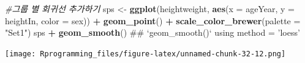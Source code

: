 \documentclass[10pt,]{krantz}
\makeatletter
\newenvironment{Shaded}{\begin{snugshade}}{\end{snugshade}}
\newcommand{\KeywordTok}[1]{\textcolor[rgb]{0.13,0.29,0.53}{\textbf{#1}}}
\newcommand{\DataTypeTok}[1]{\textcolor[rgb]{0.13,0.29,0.53}{#1}}
\newcommand{\StringTok}[1]{\textcolor[rgb]{0.31,0.60,0.02}{#1}}
\newcommand{\CommentTok}[1]{\textcolor[rgb]{0.56,0.35,0.01}{\textit{#1}}}
\newcommand{\OperatorTok}[1]{\textcolor[rgb]{0.81,0.36,0.00}{\textbf{#1}}}
\newcommand{\NormalTok}[1]{#1}
\newenvironment{kframe}{%
\medskip{}
\setlength{\fboxsep}{.8em}
 \def\at@end@of@kframe{}%
 \ifinner\ifhmode%
  \def\at@end@of@kframe{\end{minipage}}%
  \begin{minipage}{\columnwidth}%
 \fi\fi%
 \def\FrameCommand##1{\hskip\@totalleftmargin \hskip-\fboxsep
 \colorbox{shadecolor}{##1}\hskip-\fboxsep
     \hskip-\linewidth \hskip-\@totalleftmargin \hskip\columnwidth}%
 \MakeFramed {\advance\hsize-\width
   \@totalleftmargin\z@ \linewidth\hsize
   \@setminipage}}%
 {\par\unskip\endMakeFramed%
 \at@end@of@kframe}
\renewenvironment{Shaded}{\begin{kframe}}{\end{kframe}}
\theoremstyle{definition}
\theoremstyle{definition}
\theoremstyle{remark}
\makeatother
\begin{document}
\begin{Shaded}
\begin{Highlighting}[]


\CommentTok{#그룹 별 회귀선 추가하기}
\NormalTok{sps <-}\StringTok{ }\KeywordTok{ggplot}\NormalTok{(heightweight, }\KeywordTok{aes}\NormalTok{(}\DataTypeTok{x =}\NormalTok{ ageYear, }\DataTypeTok{y =}\NormalTok{ heightIn, }\DataTypeTok{color =}\NormalTok{ sex)) }\OperatorTok{+}\StringTok{ }
\StringTok{  }\KeywordTok{geom_point}\NormalTok{() }\OperatorTok{+}\StringTok{ }\KeywordTok{scale_color_brewer}\NormalTok{(}\DataTypeTok{palette =} \StringTok{"Set1"}\NormalTok{)}
\NormalTok{sps }\OperatorTok{+}\StringTok{ }\KeywordTok{geom_smooth}\NormalTok{()}
\NormalTok{## `geom_smooth()` using method = 'loess'}
\end{Highlighting}
\end{Shaded}

\texttt{[image: Rprogramming\_files/figure-latex/unnamed-chunk-32-12.png]}
\end{document}
